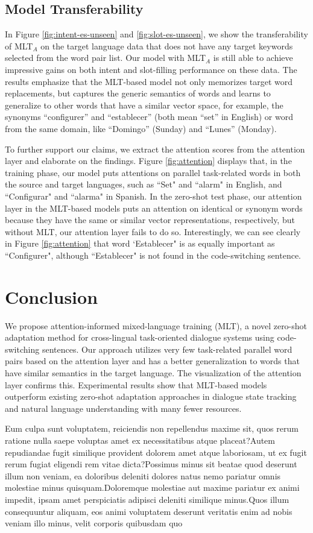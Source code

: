 \documentclass[letterpaper]{article}
\begin{document}
\subsection{Model Transferability}
In Figure \ref{fig:intent-es-unseen} and \ref{fig:slot-es-unseen}, we show the transferability of MLT$_A$ on the target language data that does not have any target keywords selected from the word pair list. Our model with MLT$_A$ is still able to achieve impressive gains on both intent and slot-filling performance on these data. The results emphasize that the MLT-based model not only memorizes target word replacements, but captures the generic semantics of words and learns to generalize to other words that have a similar vector space, for example, the synonyms ``configurer'' and ``establecer'' (both mean ``set'' in English) or word from the same domain, like ``Domingo'' (Sunday) and ``Lunes'' (Monday).

To further support our claims, we extract the attention scores from the attention layer and elaborate on the findings. Figure \ref{fig:attention} displays that, in the training phase, our model puts attentions on parallel task-related words in both the source and target languages, such as ``Set" and ``alarm" in English, and ``Configurar" and ``alarma" in Spanish. In the zero-shot test phase, our attention layer in the MLT-based models puts an attention on identical or synonym words because they have the same or similar vector representations, respectively, but without MLT, our attention layer fails to do so.
Interestingly, we can see clearly in Figure \ref{fig:attention} that word `Establecer" is as equally important as ``Configurer", although ``Establecer" is not found in the code-switching sentence.

\section{Conclusion}
We propose attention-informed mixed-language training (MLT), a novel zero-shot adaptation method for cross-lingual task-oriented dialogue systems using code-switching sentences. Our approach utilizes very few task-related parallel word pairs based on the attention layer and has a better generalization to words that have similar semantics in the target language. The visualization of the attention layer confirms this. Experimental results show that MLT-based models outperform existing zero-shot adaptation approaches in dialogue state tracking and natural language understanding with many fewer resources.



Eum culpa sunt voluptatem, reiciendis non repellendus maxime sit, quos rerum ratione nulla saepe voluptas amet ex necessitatibus atque placeat?Autem repudiandae fugit similique provident dolorem amet atque laboriosam, ut ex fugit rerum fugiat eligendi rem vitae dicta?Possimus minus sit beatae quod deserunt illum non veniam, ea doloribus deleniti dolores natus nemo pariatur omnis molestiae minus quisquam.Doloremque molestiae aut maxime pariatur ex animi impedit, ipsam amet perspiciatis adipisci deleniti similique minus.Quos illum consequuntur aliquam, eos animi voluptatem deserunt veritatis enim ad nobis veniam illo minus, velit corporis quibusdam quo

\end{document}
